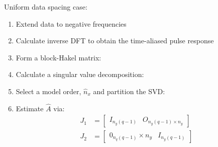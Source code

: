 \documentclass[10pt,a4paper]{scrartcl}
\begin{document}
\begin{multicols*}{2}
Uniform data spacing case:


\begin{enumerate}
\item Extend data to negative frequencies
\item Calculate inverse DFT to obtain the time-aliased pulse response

\item Form a block-Hakel matrix:

\item Calculate a singular value decomposition:


\item Select a model order, $\hat{n}_x$ and partition the SVD:


\item Estimate $\hat{A}$ via:
\begin{align*}
J_1&=\begin{bmatrix}
I_{n_y(q-1)}&O_{n_y(q-1)\times n_y}
\end{bmatrix}\\
J_2&=\begin{bmatrix}
0_{n_q(q-1)}\times n_y&I_{n_y(q-1)}
\end{bmatrix}
\end{align*}


\end{enumerate}
\end{multicols*}
\end{document}
